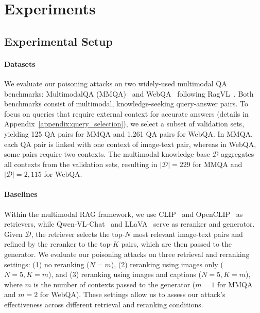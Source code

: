 \section{Experiments}





% 
\subsection{Experimental Setup}
\paragraph{Datasets}
We evaluate our poisoning attacks on two widely-used multimodal QA benchmarks: MultimodalQA (MMQA)~\cite{talmor2021multimodalqa} and WebQA~\cite{chang2022webqa} following RagVL~\cite{chen2024mllm}.
Both benchmarks consist of multimodal, knowledge-seeking query-answer pairs. To focus on queries that require external context for accurate answers (details in Appendix~\ref{appendix:query_selection}), we select a subset of validation sets, yielding 125 QA pairs for MMQA and 1,261 QA pairs for WebQA. In MMQA, each QA pair is linked with one context of image-text pair, whereas in WebQA, some pairs require two contexts. 
The multimodal knowledge base $\mathcal{D}$ aggregates all contexts from the validation sets, resulting in $|\mathcal{D}| = 229$ for MMQA and $|\mathcal{D}| = 2,115$ for WebQA. 

\paragraph{Baselines}
Within the multimodal RAG framework, we use CLIP~\cite{radford2021learning} and OpenCLIP~\cite{openclip} as retrievers, while Qwen-VL-Chat~\cite{bai2023qwen} and LLaVA~\cite{liu2024llavanext} serve as reranker and generator. Given $\mathcal{D}$, the retriever selects the top-$N$ most relevant image-text pairs and refined by the reranker to the top-$K$ pairs, which are then passed to the generator. We evaluate our poisoning attacks on three retrieval and reranking settings: (1) no reranking ($N=m$), (2) reranking using images only ($N=5, K=m$), and (3) reranking using images and captions ($N=5, K=m$), where $m$ is the number of contexts passed to the generator ($m=1$ for MMQA and $m=2$ for WebQA). These settings allow us to assess our attack's effectiveness across different retrieval and reranking conditions.

